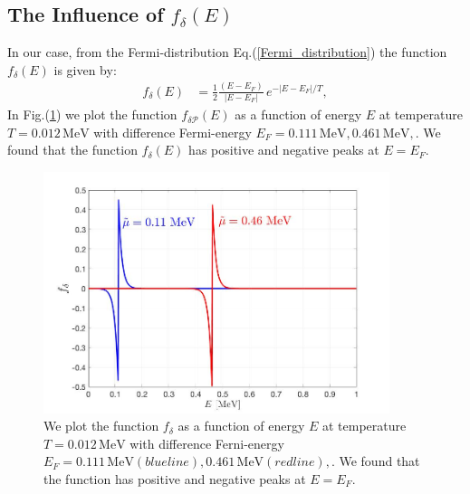 \documentclass[onecolumn,preprintnumbers,amsmath,amssymb]{revtex4}
\begin{document}
\subsection{The Influence of $f_{\delta}(E)$}
In our case, from the Fermi-distribution Eq.(\ref{Fermi_distribution}) the function $f_\delta(E)$ is given by:
\begin{align}
f_{\delta}(E)&=\frac{1}{2}\frac{(E-E_F)}{|E-E_F|}\,e^{-|E-E_F|/T},
\end{align}
In Fig.(\ref{f_delta_graph}) we plot the function $f_{\delta\mathcal{P}}(E)$ as a function of energy $E$ at temperature $T=0.012\,\mathrm{MeV}$ with difference Fermi-energy $E_F=0.111\,\mathrm{MeV},0.461\,\mathrm{MeV},$. We found that the function $f_\delta(E)$ has positive and negative peaks at $E=E_F$.  %
\begin{figure}[t]
\begin{center}
\includegraphics[width=0.9\textwidth]{./plot/f_delta}
\caption{We plot the function $f_\delta$ as a function of energy $E$ at temperature $T=0.012\,\mathrm{MeV}$ with difference Ferni-energy $E_F=0.111\,\mathrm{MeV}(blue line),0.461\,\mathrm{MeV}(red line),$. We found that the function has positive and negative peaks at  $E=E_F$. }
\label{f_delta_graph}
\end{center}
\end{figure}
\end{document}
